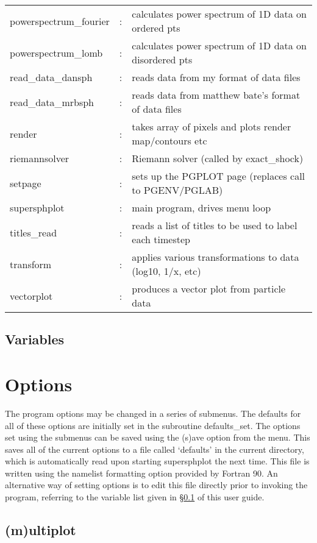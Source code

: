 \documentclass[a4paper,12pt]{article}
\begin{document}
\begin{tabular}{lcp{}}
powerspectrum\_fourier & : & calculates power spectrum of 1D data on ordered pts\\
powerspectrum\_lomb & : & calculates power spectrum of 1D data on disordered pts\\
read\_data\_dansph   & : & reads data from my format of data files\\
read\_data\_mrbsph   & : & reads data from matthew bate's format of data files\\
render	 	 & : & takes array of pixels and plots render map/contours etc\\
riemannsolver      & : & Riemann solver (called by exact\_shock)\\
setpage            & : & sets up the PGPLOT page (replaces call to PGENV/PGLAB)\\
supersphplot	 & : & main program, drives menu loop\\
titles\_read        & : & reads a list of titles to be used to label each timestep\\
transform	 	 & : & applies various transformations to data (log10, 1/x, etc)\\
vectorplot         & : & produces a vector plot from particle data
\end{tabular}

\subsection{Variables}
\label{sec:variables}

\section{Options}
 The program options may be changed in a series of submenus. The defaults for all of
these options are initially set in the subroutine defaults\_set. The options set using
the submenus can be saved using the (s)ave option from the menu. This saves all of
the current options to a file called `defaults' in the current directory, which is
automatically read upon starting supersphplot the next time. This file is written using
the namelist formatting option provided by Fortran 90. An alternative way of setting
options is to edit this file directly prior to invoking the program, referring to the
variable list given in \S\ref{sec:variables} of this user guide. 

\subsection{(m)ultiplot}
\end{document}
